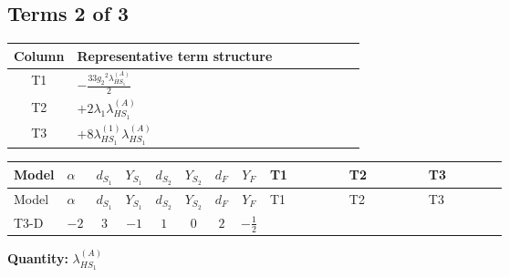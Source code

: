 \documentclass[8pt]{article}
\begin{document}
\begin{landscape}
\subsection*{Terms 2 of 3}
\begin{center}
\begin{tabular}{@{}c >{\raggedright\arraybackslash}p{0.82\linewidth}@{}}
\toprule
Column & Representative term structure \\
\midrule
T1 & \(\displaystyle -\frac{33 {g_2}^2 {\lambda_{HS_1}^{(A)}}}{2}\) \\
\midrule
T2 & \(\displaystyle +2 {\lambda_1} {\lambda_{HS_1}^{(A)}}\) \\
\midrule
T3 & \(\displaystyle +8 {\lambda_{HS_1}^{(1)}} {\lambda_{HS_1}^{(A)}}\) \\
\midrule
\bottomrule
\end{tabular}
\end{center}
\smallskip
\tiny
\begin{longtable}{@{}llcccccc >{\raggedright\arraybackslash}p{0.21\linewidth} >{\raggedright\arraybackslash}p{0.21\linewidth} >{\raggedright\arraybackslash}p{0.21\linewidth}@{}}
\toprule
Model & $\alpha$ & $d_{S_1}$ & $Y_{S_1}$ & $d_{S_2}$ & $Y_{S_2}$ & $d_F$ & $Y_F$ & T1 & T2 & T3 \\
\midrule
\endfirsthead
\toprule
Model & $\alpha$ & $d_{S_1}$ & $Y_{S_1}$ & $d_{S_2}$ & $Y_{S_2}$ & $d_F$ & $Y_F$ & T1 & T2 & T3 \\
\midrule
\endhead
T3-D & $-2$ & $3$ & $-1$ & $1$ & $0$ & $2$ & $-\frac{1}{2}$ & \scriptsize\adjustbox{max width=\linewidth}{$\begin{gathered} -\frac{33 {g_2}^2 {\lambda_{HS_1}^{(A)}}}{2}\end{gathered}$} & \scriptsize\adjustbox{max width=\linewidth}{$\begin{gathered} +2 {\lambda_1} {\lambda_{HS_1}^{(A)}}\end{gathered}$} & \scriptsize\adjustbox{max width=\linewidth}{$\begin{gathered} +8 {\lambda_{HS_1}^{(1)}} {\lambda_{HS_1}^{(A)}}\end{gathered}$} \\
\midrule
\bottomrule
\end{longtable}
\clearpage
\noindent\textbf{Quantity: }$\lambda_{HS_1}^{(A)}$\par\smallskip

\end{landscape}
\end{document}
